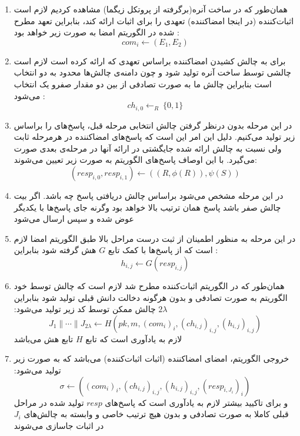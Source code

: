 \begin{itemize}
\begin{enumerate}
	\item {
	همان‌طور که در ساخت آنره(برگرفته از پروتکل زیگما) مشاهده کردیم لازم است اثبات‌کننده (در اینجا امضاکننده) تعهدی را برای اثبات ارائه کند، بنابراین تعهد مطرح شده در الگوریتم امضا به صورت زیر خواهد بود :
	$$ com_i \leftarrow (E_1,E_2) $$
	}

	\item {
	برای به چالش کشیدن امضاکننده براساس تعهدی که ارائه کرده است لازم است چالشی توسط ساخت آنره تولید شود و چون دامنه‌ی چالش‌ها محدود به دو انتخاب است بنابراین چالش ما به صورت تصادفی از بین دو مقدار صفرو یک انتخاب می‌شود :
	$$ ch_{i,0} {\leftarrow}_R ~ \{0,1\} $$
	}

	\item {
	در این مرحله بدون درنظر گرفتن چالش انتخابی مرحله قبل، پاسخ‌های را براساس زیر تولید می‌کنیم. دلیل این امر این است که پاسخ‌های امضاکننده در هرمرحله ثابت ولی نسبت به چالش ارائه شده جایگشتی در ارائه آنها در مرحله‌ی بعدی صورت می‌گیرد. با این اوصاف پاسخ‌های الگوریتم به صورت زیر تعیین می‌شوند:
	$$ (resp_{i,0} , resp_{i,1}) \leftarrow ( (R , \phi(R)) , \psi(S)) $$
	}

	\item {
	در این مرحله مشخص می‌شود براساس چالش دریافتی پاسخ چه باشد. اگر بیت چالش صفر باشد پاسخ همان ترتیب بالا خواهد بود وگرنه جای پاسخ‌ها با یکدیگر عوض شده و سپس ارسال می‌شود
	}

	\item {
	در این مرحله به منظور اطمینان از ثبت درست مراحل بالا طبق الگوریتم امضا لازم است که از پاسخ‌ها با کمک تابع
	$G$
	هش گرفته شود بنابراین :
	$$ h_{i,j} \leftarrow G(resp_{i,j}) $$
	}

	\item {
	همان‌طور که در الگوریتم اثبات‌کننده مطرح شد لازم است که چالش توسط خود الگوریتم به صورت تصادفی و بدون هرگونه دخالت دانش قبلی تولید شود بنابراین 
	$2\lambda$
	چالش ممکن توسط کد زیر تولید می‌شود:
	$$ J_1 \parallel \cdots \parallel J_{2 \lambda} \leftarrow 
	   H(pk , m , (com_i)_i , (ch_{i,j})_{i,j} , (h_{i,j})_{i,j} )
    $$
    لازم به یادآوری است که تابع 
    $H$
    تابع هش می‌باشد
	}

	\item{
	خروجی الگوریتم، امضای امضاکننده (اثبات اثبات‌کننده) می‌باشد که به صورت زیر تولید می‌شود:
	$$ \sigma \leftarrow ( (com_i)_i , (ch_{i,j})_{i,j} , (h_{i,j})_{i,j} , (resp_{i,J_i})_i ) $$
و برای تاکیید بیشتر لازم به یادآوری است که پاسخ‌های
	$resp$
تولید شده در مراحل قبلی کاملا به صورت تصادفی و بدون هیچ ترتیب خاصی و وابسته به چالش‌های
	$J_i$
	در اثبات جاسازی می‌شوند
	}
\end{enumerate}


\end{itemize}
